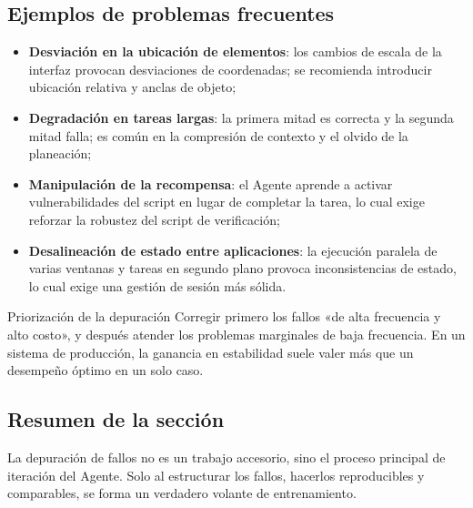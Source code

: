 \subsection{Ejemplos de problemas frecuentes}
\begin{itemize}
    \item \textbf{Desviación en la ubicación de elementos}: los cambios de escala de la interfaz provocan desviaciones de coordenadas; se recomienda introducir ubicación relativa y anclas de objeto;
    \item \textbf{Degradación en tareas largas}: la primera mitad es correcta y la segunda mitad falla; es común en la compresión de contexto y el olvido de la planeación;
    \item \textbf{Manipulación de la recompensa}: el Agente aprende a activar vulnerabilidades del script en lugar de completar la tarea, lo cual exige reforzar la robustez del script de verificación;
    \item \textbf{Desalineación de estado entre aplicaciones}: la ejecución paralela de varias ventanas y tareas en segundo plano provoca inconsistencias de estado, lo cual exige una gestión de sesión más sólida.
\end{itemize}

\begin{importantbox}{Priorización de la depuración}
Corregir primero los fallos «de alta frecuencia y alto costo», y después atender los problemas marginales de baja frecuencia. En un sistema de producción, la ganancia en estabilidad suele valer más que un desempeño óptimo en un solo caso.
\end{importantbox}

\subsection{Resumen de la sección}
La depuración de fallos no es un trabajo accesorio, sino el proceso principal de iteración del Agente. Solo al estructurar los fallos, hacerlos reproducibles y comparables, se forma un verdadero volante de entrenamiento.

